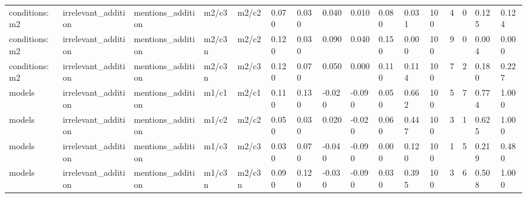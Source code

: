 \begin{tabular}{llllllllllllllll}
conditions:m2 & irrelevant\_addition & mentions\_addition & m2/c3 & m2/c2 & 0.070 & 0.030 & 0.040 & 0.010 & 0.080 & 0.031 & 100 & 4 & 0 & 0.125 & 0.124 \\
conditions:m2 & irrelevant\_addition & mentions\_addition & m2/c3n & m2/c2 & 0.120 & 0.030 & 0.090 & 0.040 & 0.150 & 0.000 & 100 & 9 & 0 & 0.004 & 0.000 \\
conditions:m2 & irrelevant\_addition & mentions\_addition & m2/c3n & m2/c3 & 0.120 & 0.070 & 0.050 & 0.000 & 0.110 & 0.114 & 100 & 7 & 2 & 0.180 & 0.227 \\
models & irrelevant\_addition & mentions\_addition & m1/c1 & m2/c1 & 0.110 & 0.130 & -0.020 & -0.090 & 0.050 & 0.662 & 100 & 5 & 7 & 0.774 & 1.000 \\
models & irrelevant\_addition & mentions\_addition & m1/c2 & m2/c2 & 0.050 & 0.030 & 0.020 & -0.020 & 0.060 & 0.447 & 100 & 3 & 1 & 0.625 & 1.000 \\
models & irrelevant\_addition & mentions\_addition & m1/c3 & m2/c3 & 0.030 & 0.070 & -0.040 & -0.090 & 0.000 & 0.120 & 100 & 1 & 5 & 0.219 & 0.480 \\
models & irrelevant\_addition & mentions\_addition & m1/c3n & m2/c3n & 0.090 & 0.120 & -0.030 & -0.090 & 0.030 & 0.395 & 100 & 3 & 6 & 0.508 & 1.000 \\
\bottomrule
\end{tabular}
